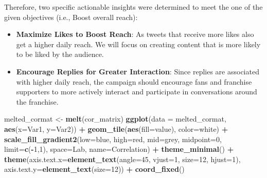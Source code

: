 \documentclass[
]{book}
\newenvironment{Shaded}{\begin{snugshade}}{\end{snugshade}}
\newcommand{\AttributeTok}[1]{\textcolor[rgb]{0.13,0.29,0.53}{#1}}
\newcommand{\DecValTok}[1]{\textcolor[rgb]{0.00,0.00,0.81}{#1}}
\newcommand{\FunctionTok}[1]{\textcolor[rgb]{0.13,0.29,0.53}{\textbf{#1}}}
\newcommand{\NormalTok}[1]{#1}
\newcommand{\OtherTok}[1]{\textcolor[rgb]{0.56,0.35,0.01}{#1}}
\newcommand{\SpecialCharTok}[1]{\textcolor[rgb]{0.81,0.36,0.00}{\textbf{#1}}}
\newcommand{\StringTok}[1]{\textcolor[rgb]{0.31,0.60,0.02}{#1}}
\begin{document}
Therefore, two specific actionable insights were determined to meet the one of the given objectives (i.e., Boost overall reach):

\begin{itemize}
\item
  \textbf{Maximize Likes to Boost Reach}: As tweets that receive more likes also get a higher daily reach. We will focus on creating content that is more likely to be liked by the audience.
\item
  \textbf{Encourage Replies for Greater Interaction}: Since replies are associated with higher daily reach, the campaign should encourage fans and franchise supporters to more actively interact and participate in conversations around the franchise.
\end{itemize}

\begin{Shaded}
\begin{Highlighting}[]
\NormalTok{melted\_cormat }\OtherTok{\textless{}{-}} \FunctionTok{melt}\NormalTok{(cor\_matrix)}
\FunctionTok{ggplot}\NormalTok{(}\AttributeTok{data =}\NormalTok{ melted\_cormat, }\FunctionTok{aes}\NormalTok{(}\AttributeTok{x=}\NormalTok{Var1, }\AttributeTok{y=}\NormalTok{Var2)) }\SpecialCharTok{+}
  \FunctionTok{geom\_tile}\NormalTok{(}\FunctionTok{aes}\NormalTok{(}\AttributeTok{fill=}\NormalTok{value), }\AttributeTok{color=}\StringTok{\textquotesingle{}white\textquotesingle{}}\NormalTok{) }\SpecialCharTok{+}
  \FunctionTok{scale\_fill\_gradient2}\NormalTok{(}\AttributeTok{low=}\StringTok{\textquotesingle{}blue\textquotesingle{}}\NormalTok{, }\AttributeTok{high=}\StringTok{\textquotesingle{}red\textquotesingle{}}\NormalTok{, }\AttributeTok{mid=}\StringTok{\textquotesingle{}grey\textquotesingle{}}\NormalTok{, }\AttributeTok{midpoint=}\DecValTok{0}\NormalTok{, }\AttributeTok{limit=}\FunctionTok{c}\NormalTok{(}\SpecialCharTok{{-}}\DecValTok{1}\NormalTok{,}\DecValTok{1}\NormalTok{), }\AttributeTok{space=}\StringTok{\textquotesingle{}Lab\textquotesingle{}}\NormalTok{, }\AttributeTok{name=}\StringTok{\textquotesingle{}Correlation\textquotesingle{}}\NormalTok{) }\SpecialCharTok{+}
  \FunctionTok{theme\_minimal}\NormalTok{() }\SpecialCharTok{+}
  \FunctionTok{theme}\NormalTok{(}\AttributeTok{axis.text.x=}\FunctionTok{element\_text}\NormalTok{(}\AttributeTok{angle=}\DecValTok{45}\NormalTok{, }\AttributeTok{vjust=}\DecValTok{1}\NormalTok{, }\AttributeTok{size=}\DecValTok{12}\NormalTok{, }\AttributeTok{hjust=}\DecValTok{1}\NormalTok{),}
        \AttributeTok{axis.text.y=}\FunctionTok{element\_text}\NormalTok{(}\AttributeTok{size=}\DecValTok{12}\NormalTok{)) }\SpecialCharTok{+}
  \FunctionTok{coord\_fixed}\NormalTok{()}
\end{Highlighting}
\end{Shaded}
\end{document}
